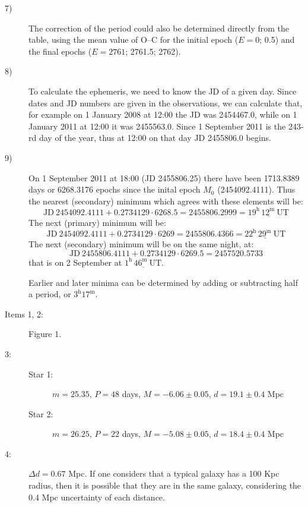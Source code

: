 \begin{description}
\item[7)] The correction of the period could also be determined directly from
  the table, using the mean value of O--C for the initial epoch ($E = 0$; 0.5)
  and the final epochs ($E = 2761$; 2761.5; 2762).

\item[8)] To calculate the ephemeris, we need to know the JD of a given day.
  Since dates and JD numbers are given in the observations, we can calculate
  that, for example on 1 January 2008 at 12:00 the JD was 2454467.0, while on
  1 January 2011 at 12:00 it was 2455563.0. Since 1 September 2011 is the
  243-rd day of the year, thus at 12:00 on that day JD 2455806.0 begins.

\item[9)] On 1 September 2011 at 18:00 (JD 2455806.25) there have been
  1713.8389 days or 6268.3176 epochs since the inital epoch $M_0$
  (2454092.4111). Thus the nearest (secondary) minimum which agrees with
  these elements will be:
  \[ \mathrm{JD}\ 2454092.4111 + 0.2734129 \cdot 6268.5 = 2455806.2999
     = \underline{19^{\mathrm{h}}\,12^{\mathrm{m}}\ \mathrm{UT}} \]
  The next (primary) minimum will be:
  \[ \mathrm{JD}\ 2454092.4111 + 0.2734129 \cdot 6269 = 2455806.4366
     = \underline{22^{\mathrm{h}}\,29^{\mathrm{m}}\ \mathrm{UT}} \]
  The next (secondary) minimum will be on the same night, at:
  \[ \mathrm{JD}\ 2455806.4111 + 0.2734129 \cdot 6269.5 = 2457520.5733 \]
  that is on 2 September at
  $\underline{1^{\mathrm{h}}\,46^{\mathrm{m}}\ \mathrm{UT}}$.

  Earlier and later minima can be determined by adding or subtracting half a
  period, or $3^{\mathrm{h}}17^{\mathrm{m}}$.
\end{description}


\begin{description}
\item[Items 1, 2:] Figure 1.

\item[3:] \hfill
  \begin{description}
  \item[Star 1:] $m = 25.35$, $P = 48$ days, $M = -6.06 \pm 0.05$,
    $d = 19.1 \pm 0.4$ Mpc
  \item[Star 2:] $m = 26.25$, $P = 22$ days, $M = -5.08 \pm 0.05$,
    $d = 18.4 \pm 0.4$ Mpc
  \end{description}

\item[4:] $\Delta d = 0.67$ Mpc. If one considers that a typical galaxy has a
  100 Kpc radius, then it is possible that they are in the same galaxy,
  considering the 0.4 Mpc uncertainty of each distance.
\end{description}

